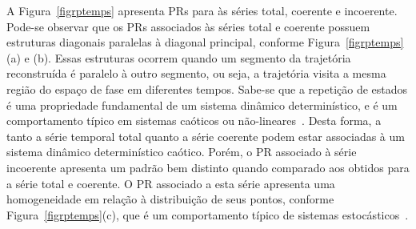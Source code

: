 A Figura~\ref{figrptemps} apresenta PRs para às séries total, coerente e incoerente. Pode-se observar que os PRs associados às séries total e coerente possuem estruturas diagonais paralelas à diagonal principal, conforme Figura~\ref{figrptemps}(a) e (b). Essas estruturas ocorrem quando um segmento da trajetória reconstruída é paralelo à outro segmento, ou seja, a trajetória visita a mesma região do espaço de fase em diferentes tempos. Sabe-se que a repetição de estados é uma propriedade fundamental de um sistema dinâmico determinístico, e é um comportamento típico em sistemas caóticos ou não-lineares~\cite{thieltese/04}. Desta forma, a tanto a série temporal total quanto a série coerente podem estar associadas à um sistema dinâmico determinístico caótico. Porém, o PR associado à série incoerente apresenta um padrão bem distinto quando comparado aos obtidos para a série total e coerente. O PR associado a esta série apresenta uma homogeneidade em relação à distribuição de seus pontos, conforme Figura~\ref{figrptemps}(c), que é um comportamento típico de sistemas estocásticos~\cite{thieltese/04}. 

